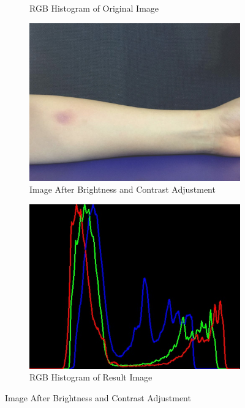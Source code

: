 \begin{figure}[!h]
\begin{subfigure}{.5\textwidth}
  \caption{RGB Histogram of Original Image}
  \label{fig:sub2}
\end{subfigure}
\begin{subfigure}{.5\textwidth}
  \centering
  \includegraphics[scale=0.23]{img/brightresult}
  \caption{Image After Brightness and Contrast Adjustment}
  \label{fig:sub2}
\end{subfigure}%
\begin{subfigure}{.5\textwidth}
  \centering
  \includegraphics[scale=0.43]{img/imagergb}
  \caption{RGB Histogram of Result Image}
  \label{fig:sub2}
\end{subfigure}
\caption{Image After Brightness and Contrast Adjustment}
\label{fig:test}
\end{figure}

